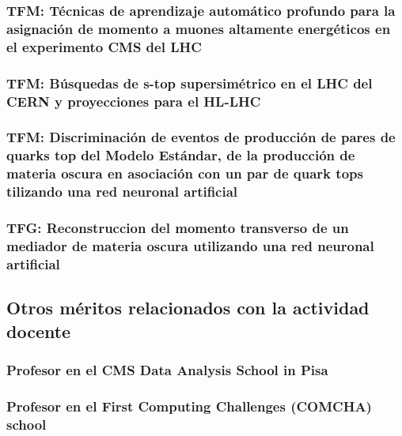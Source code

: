 \documentclass[a4paper, 11pt, twoside, openright]{report}
\begin{document}
\subsubsection{TFM: Técnicas de aprendizaje automático profundo para la asignación de momento a muones altamente energéticos en el experimento CMS del LHC}


\subsubsection{TFM: Búsquedas de s-top supersimétrico en el LHC del CERN y proyecciones para el HL-LHC}


\subsubsection{TFM: Discriminación de eventos de producción de pares de quarks top del Modelo Estándar, de la producción de materia oscura en asociación con un par de quark tops tilizando una red neuronal artificial}


\subsubsection{TFG: Reconstruccion del momento transverso de un mediador de materia oscura utilizando una red neuronal artificial}




\subsection{Otros méritos relacionados con la actividad docente}

\subsubsection{Profesor en el CMS Data Analysis School in Pisa}


\subsubsection{Profesor en el First Computing Challenges (COMCHA) school}

\end{document}
